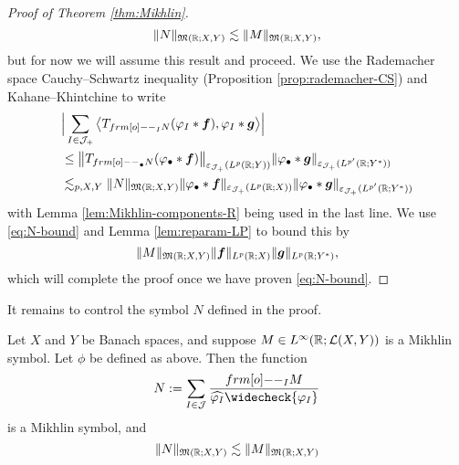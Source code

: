 \begin{proof}[Proof of Theorem \ref{thm:Mikhlin}]
\begin{equation}
  \|N\|_{\mathfrak{M}(\mathbb{R};X,Y)} \lesssim \|M\|_{\mathfrak{M}(\mathbb{R};X,Y)},
\end{equation}
but for now we will assume this result and proceed.
We use the Rademacher space Cauchy--Schwartz inequality (Proposition \ref{prop:rademacher-CS}) and Kahane--Khintchine to write
\begin{equation*}
  \begin{aligned}
    &\Big| \sum_{I \in \mc{J}_{+}} \big\langle T_{\1_{I} N} (\phi_{I} \ast \mb{f}) , \phi_{I} \ast \mb{g} \big\rangle \Big| \\
    &\leq \big\| T_{\1_{\bullet} N} (\phi_{\bullet} \ast \mb{f}) \big\|_{\varepsilon_{\mc{J}_{+}}(L^p(\R;Y))}
    \| \phi_{\bullet} \ast \mb{g} \|_{\varepsilon_{\mc{J}_{+}}(L^{p'}(\R;Y^{*}))} \\
    &\lesssim_{p,X,Y} \|N\|_{\mf{M}(\R;X,Y)} \| \phi_{\bullet} \ast \mb{f} \|_{\varepsilon_{\mc{J}_{+}}(L^p(\R;X))}
    \|\phi_{\bullet} \ast \mb{g} \|_{\varepsilon_{\mc{J}_{+}}(L^{p'}(\R;Y^{*}))} \\
  \end{aligned}
\end{equation*}
with Lemma \ref{lem:Mikhlin-components-R} being used in the last line.
We use \eqref{eq:N-bound} and Lemma \ref{lem:reparam-LP} to bound this by
\begin{equation*}
  \|M\|_{\mathfrak{M}(\mathbb{R};X,Y)} \| \bm{f} \|_{L^p(\mathbb{R};X)} \| \bm{g} \|_{L^p(\mathbb{R};Y^{*})},
\end{equation*}
which will complete the proof once we have proven \eqref{eq:N-bound}.
\end{proof}

It remains to control the symbol $N$ defined in the proof.

\begin{lem}\label{lem:N-symbol}
  Let $X$ and $Y$ be Banach spaces, and suppose $M \in L^\infty(\mathbb{R};\mathcal{L}(X,Y))$ is a Mikhlin symbol.
  Let $\phi$ be defined as above.
  Then the function
  \begin{equation*}
    N := \sum_{I \in \mc{J}} \frac{\1_{I} M}{\widehat{\phi_{I}} \widecheck{\phi_{I}}}
  \end{equation*}
  is a Mikhlin symbol, and
  \begin{equation*}
    \|N\|_{\mathfrak{M}(\mathbb{R};X,Y)} \lesssim \|M\|_{\mathfrak{M}(\mathbb{R};X,Y)}
  \end{equation*}
\end{lem}

